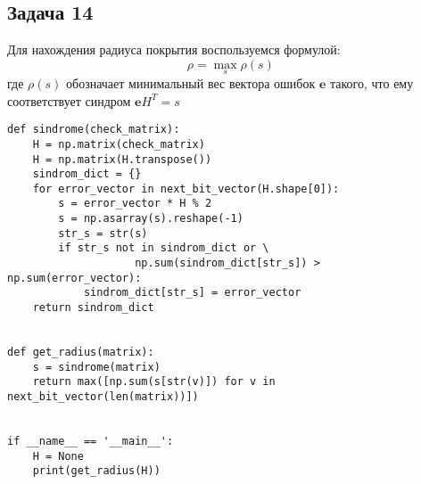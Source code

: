 \documentclass{article}
\begin{document}
\subsection{Задача 14}
Для нахождения радиуса покрытия воспользуемся формулой:
$$\rho=\max_{s}\rho(s)\,$$
где $\rho(s)$ обозначает минимальный вес вектора ошибок $\boldsymbol{e}$ такого, что ему соответствует синдром $\boldsymbol{e}H^{T}=s$
\begin{lstlisting}[frame=single]
def sindrome(check_matrix):
    H = np.matrix(check_matrix)
    H = np.matrix(H.transpose())
    sindrom_dict = {}
    for error_vector in next_bit_vector(H.shape[0]):
        s = error_vector * H % 2
        s = np.asarray(s).reshape(-1)
        str_s = str(s)
        if str_s not in sindrom_dict or \
                    np.sum(sindrom_dict[str_s]) > np.sum(error_vector):
            sindrom_dict[str_s] = error_vector
    return sindrom_dict


def get_radius(matrix):
    s = sindrome(matrix)
    return max([np.sum(s[str(v)]) for v in next_bit_vector(len(matrix))])


if __name__ == '__main__':
    H = None
    print(get_radius(H))
\end{lstlisting}
%
\end{document}
